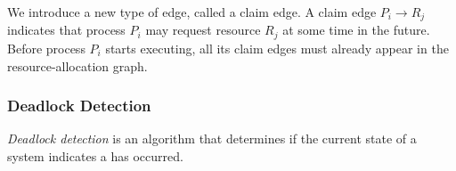We introduce a new type of edge, called a claim edge.
A claim edge $P_{i} \rightarrow R_{j}$ indicates that process $P_{i}$ may request resource $R_{j}$ at some time in the future.
Before process $P_{i}$ starts executing, all its claim edges must already appear in the resource-allocation graph.

\subsubsection{Deadlock Detection}\label{subsubsec:Deadlock_Detection}
\begin{definition}\label{def:Deadlock_Detection}
  \emph{Deadlock detection} is an algorithm that determines if the current state of a system indicates a  has occurred.
\end{definition}


